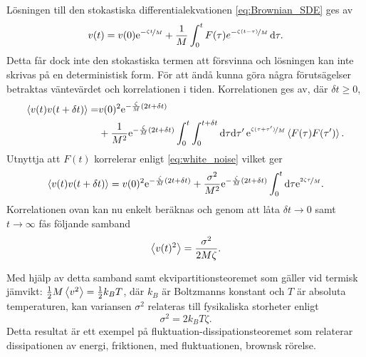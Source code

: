 Lösningen till den stokastiska differentialekvationen
\eqref{eq:Brownian_SDE} ges av  
\begin{equation}
v(t)
=v(0)\mathrm{e}^{-\nicefrac{\zeta t}{M}}
 +\frac{1}{M}\int^t_0 F(\tau)e^{-\nicefrac{\zeta (t-\tau)}{M}} \,\mathrm{d}\tau.
\end{equation}
Detta får dock inte den stokastiska termen att försvinna och lösningen kan inte skrivas på en deterministisk form. För att ändå kunna göra några förutsägelser betraktas väntevärdet och korrelationen i tiden. Korrelationen ges av, där $\delta t\geq0$,
\begin{equation}
\begin{aligned}
\ev{v(t)v(t+\delta t)} 
=& v(0)^2\ee^{-\frac{\zeta}{M}(2t+\delta t)}\\
 &+ \frac{1}{M^2}\ee^{-\frac{\zeta}{M} (2t+\delta t)}
  \int_0^t\int_0^{t+\delta t}\dd\tau\dd\tau'\, 
     \ee^{\nicefrac{\zeta (\tau+\tau')}{M}}\ev{F(\tau)F(\tau')}.
\end{aligned}
\end{equation}
Utnyttja att $F(t)$ korrelerar enligt \eqref{eq:white_noise} vilket ger 
\begin{equation} \label{eq:Brown_korr}
\ev{v(t)v(t+\delta t)} 
= v(0)^2\ee^{-\frac{\zeta}{M}(2t+\delta t)}
 +\frac{\sigma^2}{M^2}\ee^{-\frac{\zeta}{M} (2t+\delta t)}
  \int_0^t\dd\tau\ee^{\nicefrac{2\zeta \tau}{M}}.
\end{equation}
Korrelationen ovan kan nu enkelt beräknas och genom att låta $\delta t\to 0$ samt $t\to \infty$ fås följande samband
\begin{equation}
    \ev{v(t)^2} = \frac{\sigma^2}{2M\zeta}.
\end{equation}

Med hjälp av detta samband samt ekvipartitionsteoremet som gäller vid termisk jämvikt: $\frac{1}{2}M\ev{v^2}=\frac{1}{2}k_BT$, där $k_B$ är Boltzmanns konstant och $T$ är absoluta temperaturen, kan variansen $\sigma^2$ relateras till fysikaliska storheter enligt
\begin{equation}
    \sigma^2 = 2k_BT\zeta.
\end{equation}
Detta resultat är ett exempel på fluktuation-dissipationsteoremet som relaterar dissipationen av energi, friktionen, med fluktuationen, brownsk rörelse. 

